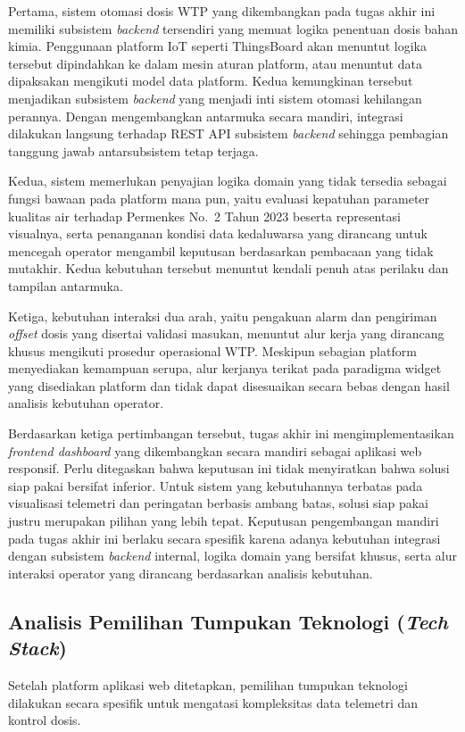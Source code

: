 Pertama, sistem otomasi dosis WTP yang dikembangkan pada tugas akhir ini memiliki subsistem \textit{backend} 
tersendiri yang memuat logika penentuan dosis bahan kimia. Penggunaan platform IoT seperti ThingsBoard 
akan menuntut logika tersebut dipindahkan ke dalam mesin aturan platform, atau menuntut data dipaksakan mengikuti 
model data platform. Kedua kemungkinan tersebut menjadikan subsistem \textit{backend} yang menjadi inti sistem 
otomasi kehilangan perannya. Dengan mengembangkan antarmuka secara mandiri, integrasi dilakukan langsung terhadap 
REST API subsistem \textit{backend} sehingga pembagian tanggung jawab antarsubsistem tetap terjaga.

Kedua, sistem memerlukan penyajian logika domain yang tidak tersedia sebagai fungsi bawaan pada platform mana pun, 
yaitu evaluasi kepatuhan parameter kualitas air terhadap Permenkes No.~2 Tahun 2023 beserta representasi 
visualnya, serta penanganan kondisi data kedaluwarsa yang dirancang untuk mencegah operator mengambil keputusan 
berdasarkan pembacaan yang tidak mutakhir. Kedua kebutuhan tersebut menuntut kendali penuh atas perilaku dan 
tampilan antarmuka.

Ketiga, kebutuhan interaksi dua arah, yaitu pengakuan alarm dan pengiriman \textit{offset} dosis yang disertai 
validasi masukan, menuntut alur kerja yang dirancang khusus mengikuti prosedur operasional WTP. Meskipun sebagian 
platform menyediakan kemampuan serupa, alur kerjanya terikat pada paradigma widget yang disediakan platform dan 
tidak dapat disesuaikan secara bebas dengan hasil analisis kebutuhan operator.

Berdasarkan ketiga pertimbangan tersebut, tugas akhir ini mengimplementasikan \textit{frontend dashboard} yang 
dikembangkan secara mandiri sebagai aplikasi web responsif. Perlu ditegaskan bahwa keputusan ini tidak menyiratkan 
bahwa solusi siap pakai bersifat inferior. Untuk sistem yang kebutuhannya terbatas pada visualisasi telemetri dan 
peringatan berbasis ambang batas, solusi siap pakai justru merupakan pilihan yang lebih tepat. Keputusan 
pengembangan mandiri pada tugas akhir ini berlaku secara spesifik karena adanya kebutuhan integrasi dengan 
subsistem \textit{backend} internal, logika domain yang bersifat khusus, serta alur interaksi operator yang 
dirancang berdasarkan analisis kebutuhan.

\subsection{Analisis Pemilihan Tumpukan Teknologi (\textit{Tech Stack})}
Setelah platform aplikasi web ditetapkan, pemilihan tumpukan teknologi dilakukan secara spesifik untuk mengatasi kompleksitas 
data telemetri dan kontrol dosis.

